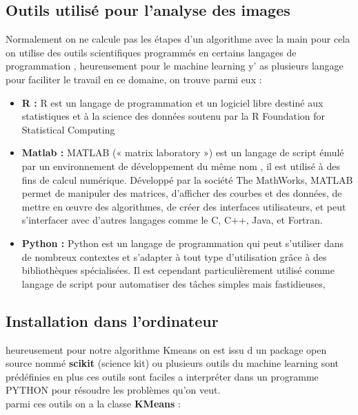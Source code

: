 \documentclass[a4paper,12pt]{report}
\begin{document}
\subsection{Outils utilisé pour l'analyse des images}
Normalement on ne calcule pas les étapes d'un algorithme avec la main pour cela on utilise des outils scientifiques programmés en certains langages de programmation , heureusement pour le machine learning y' as plusieurs langage pour faciliter le travail en ce domaine,  on trouve parmi eux : \\
\begin{itemize}
    \item \textbf{R : }R est un langage de programmation et un logiciel libre destiné aux statistiques et à la science des données soutenu par la R Foundation for Statistical Computing\\
    \item \textbf{Matlab : } MATLAB (« matrix laboratory ») est un langage de script émulé par un environnement de développement du même nom , il est utilisé à des fins de calcul numérique. Développé par la société The MathWorks, MATLAB permet de manipuler des matrices, d'afficher des courbes et des données, de mettre en œuvre des algorithmes, de créer des interfaces utilisateurs, et peut s’interfacer avec d’autres langages comme le C, C++, Java, et Fortran.\\
    \item \textbf{Python : }Python est un langage de programmation qui peut s'utiliser dans de nombreux contextes et s'adapter à tout type d'utilisation grâce à des bibliothèques spécialisées. Il est cependant particulièrement utilisé comme langage de script pour automatiser des tâches simples mais fastidieuses,
\end{itemize}

\subsection{Installation dans l'ordinateur}
heureusement pour notre algorithme Kmeans on est issu d un package open source nommé \textbf{scikit}  (science kit) ou plusieurs outils du machine learning sont prédéfinies en plus ces outils sont faciles a interpréter dans un programme PYTHON pour résoudre les problèmes qu'on veut. \\
parmi ces outils on a la classe \textbf{KMeans} :\\
\end{document}
